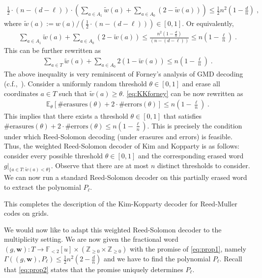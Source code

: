 \documentclass{article}
\def\Integer{\mathbb{Z}}
\def\Field{\mathbb{F}}
\let\Z\Integer
\let\F\Field
\def\E{\operatornamewithlimits{\mathbb{E}}}			%
\def\vecw{\mathbf{w}}
\renewcommand{\E}{\mathbb{E}}
\newcommand{\ow}{\widetilde{w}}
\newcommand{\vw}{\vecw}
\begin{document}
	\begin{align*}
		\frac12 \cdot (n-(d-\ell)) \cdot \left( \sum_{a \in A_1} \ow(a) +
		\sum_{a \in A_0} (2-\ow(a))\right) \leq \frac12 n^2\left(1 -
		\frac{d}{n}\right)\;,
	\end{align*}
	where $\ow(a) := w(a)/\left(\frac12 \cdot (n-(d-\ell))\right) \in
	[0,1]$. Or equivalently,
	\begin{align*}
		\sum_{a \in A_1} \ow(a) +
		\sum_{a \in A_0} (2-\ow(a)) \leq \frac{n^2\left(1 -
			\frac{d}{n}\right)}{ (n-(d-\ell))} \leq n \left( 1 -
		\frac{\ell}{n}\right)\; .
	\end{align*}
	This can be further rewritten as
	\begin{align}
		\sum_{a \in T} \ow(a) + \sum_{a \in A_0} 2(1-\ow(a)) \leq n \left( 1 -
		\frac{\ell}{n}\right)\; .\label{eq:KKforney}
	\end{align}  
	The above inequality is very reminiscent of Forney's analysis of GMD
	decoding (c.f.,~\cite[Section~12.3]{GuruswamiRS}). Consider a uniformly random
	threshold $\theta \in [0,1]$ and erase all coordinates $a
	\in T$ such that $\ow(a) \geq \theta$. \eqref{eq:KKforney} can be now
	rewritten as
	\begin{align}
		\E_\theta\left[ \text{\# erasures}(\theta) + 2\cdot \text{\# errors}(\theta)\right]
		\leq n \left( 1 -
		\frac{\ell}{n}\right)\;. \label{eq:Forneyhyp}
	\end{align}
	This implies that there exists a threshold $\theta\in [0,1]$ that
	satisfies
	$\text{\# erasures}(\theta) + 2\cdot \text{\# errors}(\theta) \leq n
	\left( 1 - \frac{\ell}{n}\right)$. This is precisely the condition
	under which Reed-Solomon decoding (under erasures and errors) is
	feasible. Thus, the weighted Reed-Solomon decoder of Kim and Kopparty
	is as follows: consider every possible threshold $\theta \in [0,1]$
	and the corresponding erased word
	$g|_{\{a \in T \colon \ow(a) < \theta\}}$. Observe that there are at most
	$n$ distinct thresholds to consider. We can now run a standard
	Reed-Solomon decoder on this partially erased word to extract the
	polynomial $P_\ell$.
	
	This completes the description of the Kim-Kopparty decoder for Reed-Muller codes on grids.
	
	We would now like to adapt this weighted
	Reed-Solomon decoder to the multiplicity setting. We are now given
	the fractional word $(g,\vw) \colon T \to
	\F_{<2}[u] \times (\Z_{\geq 0} \times \Z_{\geq 0})$ with the promise
	of \eqref{eq:prop1}, namely $\Gamma((g,\vw),P_\ell) \leq
	\frac12 n^2(2-\frac{d}n)$ and we have to find the polynomial $P_\ell$. Recall that \eqref{eq:prop2} states that
	the promise uniquely determines $P_\ell$.
	
\end{document}
